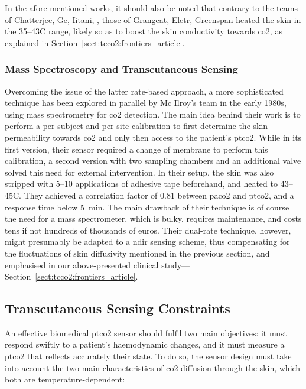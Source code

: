 In the afore-mentioned works, it should also be noted that contrary to the teams of Chatterjee, Ge, Iitani, \etal{}, those of Grangeat, Eletr, Greenspan \etal{} heated the skin in the 35--43{\degree}C range, likely so as to boost the skin conductivity towards \gls{co2}, as explained in Section~\ref{sect:tcco2:frontiers_article}.

\subsubsection{Mass Spectroscopy and Transcutaneous Sensing}

Overcoming the issue of the latter rate-based approach, a more sophisticated technique has been explored in parallel by Mc Ilroy's team in the early 1980s\cite{mcilroy1978, hansen1980, targett1984}, using mass spectrometry for \gls{co2} detection. The main idea behind their work is to perform a per-subject and per-site calibration to first determine the skin permeability towards \gls{co2} and only then access to the patient's \gls{ptco2}. While in its first version, their sensor required a change of membrane to perform this calibration\cite{hansen1980}, a second version with two sampling chambers and an additional valve solved this need for external intervention\cite{targett1984}. In their setup, the skin was also stripped with 5--10 applications of adhesive tape beforehand, and heated to 43--45{\degree}C. They achieved a correlation factor of 0.81 between \gls{paco2} and \gls{ptco2}, and a response time below 5~min. The main drawback of their technique is of course the need for a mass spectrometer, which is bulky, requires maintenance, and costs tens if not hundreds of thousands of euros. Their dual-rate technique, however, might presumably be adapted to a \gls{ndir} sensing scheme, thus compensating for the fluctuations of skin diffusivity mentioned in the previous section, and emphasised in our above-presented clinical study---Section~\ref{sect:tcco2:frontiers_article}.

\subsection{Transcutaneous Sensing Constraints}

An effective biomedical \gls{ptco2} sensor should fulfil two main objectives: it must respond swiftly to a patient's haemodynamic changes, and it must measure a \gls{ptco2} that reflects accurately their state. To do so, the sensor design must take into account the two main characteristics of \gls{co2} diffusion through the skin, which both are temperature-dependent:

